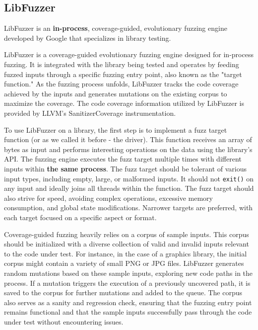 \documentclass[a4paper,11pt,oneside]{report}
\begin{document}
\subsection{LibFuzzer}

LibFuzzer \cite{libfuzzer} is an \textbf{in-process}, coverage-guided, 
evolutionary fuzzing engine developed by Google that specializes in
library testing. 


LibFuzzer is a coverage-guided evolutionary fuzzing engine 
designed for in-process fuzzing. It is integrated with the 
library being tested and operates by feeding fuzzed inputs 
through a specific fuzzing entry point, also known as the "target function." 
As the fuzzing process unfolds, LibFuzzer tracks the code 
coverage achieved by the inputs and generates mutations on 
the existing corpus to maximize the coverage. The code coverage 
information utilized by LibFuzzer is provided by LLVM's SanitizerCoverage instrumentation.

To use LibFuzzer on a library, the first step is to implement 
a fuzz target function (or as we called it before - the driver). 
This function receives an array of bytes as input and performs 
interesting operations on the data using the library's API. 
The fuzzing engine executes the fuzz target multiple times 
with different inputs within \textbf{the same process}. 
The fuzz target should be tolerant of various input types, 
including empty, large, or malformed inputs. It should not \lstinline{exit()} 
on any input and ideally joins all threads within the function. 
The fuzz target should also strive for speed, avoiding complex operations, 
excessive memory consumption, and global state modifications. 
Narrower targets are preferred, with each target focused on a specific aspect or format.

Coverage-guided fuzzing heavily relies on a corpus of sample inputs. 
This corpus should be initialized with a diverse collection 
of valid and invalid inputs relevant to the code under test. 
For instance, in the case of a graphics library, the initial 
corpus might contain a variety of small PNG or JPG files. 
LibFuzzer generates random mutations based on these sample 
inputs, exploring new code paths in the process. If a mutation triggers 
the execution of a previously uncovered path, it is saved to the 
corpus for further mutations and added to the queue. 
The corpus also serves as a sanity and regression check, 
ensuring that the fuzzing entry point remains functional 
and that the sample inputs successfully pass through the 
code under test without encountering issues.
\end{document}
